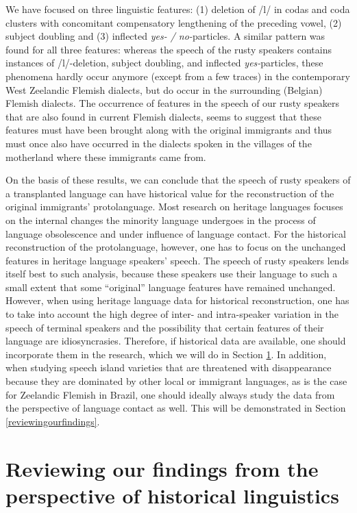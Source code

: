 \documentclass[output=paper,hidelinks,draftmode]{langscibook}
\begin{document}
We have focused on three linguistic features: (1) deletion of /l/ in codas and co\-da clusters with concomitant compensatory lengthening of the preceding vowel, (2) subject doubling and (3) inflected \textit{yes- / no-}particles. A similar pattern was found for all three features: whereas the speech of the rusty speakers contains instances of /l/-deletion, subject doubling, and inflected \textit{yes-}particles, these phenomena hardly occur anymore (except from a few traces) in the contemporary West Zeelandic Flemish dialects, but do occur in the surrounding (Belgian) Flemish dialects. The occurrence of features in the speech of our rusty speakers that are also found in current Flemish dialects, seems to suggest that these features must have been brought along with the original immigrants and thus must once also have occurred in the dialects spoken in the villages of the motherland where these immigrants came from.

On the basis of these results, we can conclude that the speech of rusty speakers of a transplanted language can have historical value for the reconstruction of the original immigrants’ protolanguage. Most research on heritage languages focuses on the internal changes the minority language undergoes in the process of language obsolescence and under influence of language contact. For the historical reconstruction of the protolanguage, however, one has to focus on the unchanged features in heritage language speakers’ speech. The speech of rusty speakers lends itself best to such analysis, because these speakers use their language to such a small extent that some ``original'' language features have remained unchanged. However, when using heritage language data for historical reconstruction, one has to take into account the high degree of inter- and intra-speaker variation in the speech of terminal speakers and the possibility that certain features of their language are idiosyncrasies. Therefore, if historical data are available, one should incorporate them in the research, which we will do in Section \ref{sec:reviewing}. In addition, when studying speech island varieties that are threatened with disappearance because they are dominated by other local or immigrant languages, as is the case for Zeelandic Flemish in Brazil, one should ideally always study the data from the perspective of language contact as well. This will be demonstrated in Section \ref{reviewingourfindings}.

\section{Reviewing our findings from the perspective of historical linguistics}
\label{sec:reviewing}
\end{document}
